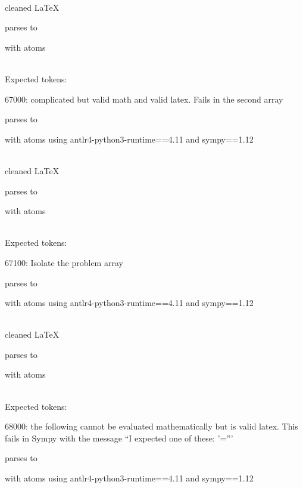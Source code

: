 \documentclass{article}
\begin{document}
\ \\
cleaned \LaTeX

parses to

with atoms


\ \\
Expected tokens:


\hrulefill

67000:
complicated but valid math and valid latex. Fails in the second array  

parses to

with atoms
using antlr4-python3-runtime==4.11 and sympy==1.12

\ \\
cleaned \LaTeX

parses to

with atoms


\ \\
Expected tokens:


\hrulefill

67100:
Isolate the problem array

parses to

with atoms
using antlr4-python3-runtime==4.11 and sympy==1.12

\ \\
cleaned \LaTeX

parses to

with atoms


\ \\
Expected tokens:



\hrulefill

68000:
the following cannot be evaluated mathematically but is valid latex. 
This fails in Sympy with the message ``I expected one of these: '='''

parses to

with atoms
using antlr4-python3-runtime==4.11 and sympy==1.12
\end{document}
